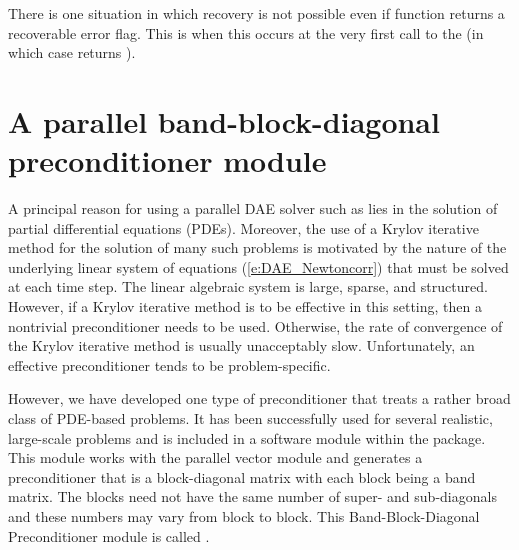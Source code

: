 {{  There is one situation in which recovery is not possible even if 
  function returns a recoverable error flag.  This is when this occurs at the very
  first call to the  (in which case {\idas} returns
  ).
}


\section{A parallel band-block-diagonal preconditioner module}\label{sss:idabbdpre}

A principal reason for using a parallel DAE solver such as {\idas} lies
in the solution of partial differential equations (PDEs).  Moreover,
the use of a Krylov iterative method for the solution of many such
problems is motivated by the nature of the underlying linear system of
equations (\ref{e:DAE_Newtoncorr}) that must be solved at each time step.  The
linear algebraic system is large, sparse, and structured. However, if
a Krylov iterative method is to be effective in this setting, then a
nontrivial preconditioner needs to be used.  Otherwise, the rate of
convergence of the Krylov iterative method is usually unacceptably
slow.  Unfortunately, an effective preconditioner tends to be
problem-specific.

However, we have developed one type of preconditioner that treats a
rather broad class of PDE-based problems.  It has been successfully
used for several realistic, large-scale problems \cite{HiTa:98} and is
included in a software module within the {\idas} package. This module
works with the parallel vector module {\nvecp} and 
generates a preconditioner that is a block-diagonal matrix with each
block being a band matrix. The blocks need not have the same number of
super- and sub-diagonals and these numbers may vary from block to
block. This Band-Block-Diagonal Preconditioner module is called
{\idabbdpre}.

}
